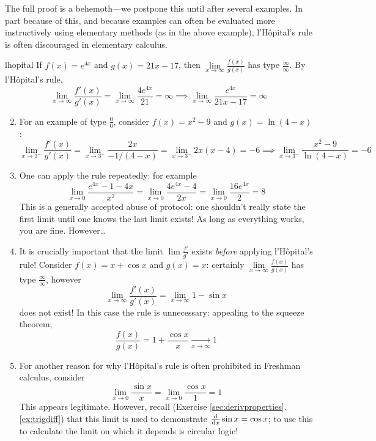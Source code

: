 The full proof is a behemoth---we postpone this until after several examples. In part because of this, and because examples can often be  evaluated more instructively using elementary methods (as in the above example), l'Hôpital's rule is often discouraged in elementary calculus.


\goodbreak


\begin{examples}{}{lhopital}
	\exstart If $f(x)=e^{4x}$ and $g(x)=21x-17$, then $\lim\limits_{x\to\infty}\frac{f(x)}{g(x)}$ has type $\frac\infty\infty$. By l'Hôpital's rule,
	\[
	 	\lim_{x\to\infty}\frac{f'(x)}{g'(x)}
	 	=\lim_{x\to\infty}\frac{4e^{4x}}{21}=\infty
	 	\implies \lim_{x\to\infty}\frac{e^{4x}}{21x-17}=\infty
	\]
	
	\begin{enumerate}\setcounter{enumi}{1}\itemsep0pt
	  \item For an example of type $\frac 00$, consider $f(x)=x^2-9$ and $g(x)=\ln(4-x)$:
	  \[
		  \lim_{x\to 3^-}\frac{f'(x)}{g'(x)} 
		  =\lim_{x\to 3^-}\frac{2x}{-1/(4-x)} 
		  =\lim_{x\to 3^-}2x(x-4)=-6
		  \implies \lim_{x\to 3^-}\frac{x^2-9}{\ln(4-x)}=-6
	  \]
	  
	  \item One can apply the rule repeatedly: for example
	  \[
	  	\lim_{x\to 0}\frac{e^{4x}-1-4x}{x^2}
	  	=\lim_{x\to 0}\frac{4e^{4x}-4}{2x} 
	  	=\lim_{x\to 0}\frac{16e^{4x}}{2}=8
	  \]
	  This is a generally accepted abuse of protocol: one shouldn't really state the first limit until one knows the last limit exists! As long as everything works, you are fine. However\ldots
	  
	  \item\label{ex:lhopitalproblem1} It is crucially important that the limit $\lim\frac{f'}{g'}$ exists \emph{before} applying l'Hôpital's rule! Consider $f(x)=x+\cos x$ and $g(x)=x$: certainly $\lim\limits_{x\to\infty}\frac{f(x)}{g(x)}$ has type $\frac\infty\infty$, however
	  \[
	  	\lim\limits_{x\to\infty}\frac{f'(x)}{g'(x)}
	  	=\lim\limits_{x\to\infty}1-\sin x
	  \]
	  does not exist! In this case the rule is unnecessary: appealing to the squeeze theorem,
	  \[
	  	\frac{f(x)}{g(x)}
	  	=1+\frac{\cos x}x\xrightarrow[x\to\infty]{} 1
	  \]
	  
	 	\item For another reason for why l'Hôpital's rule is often prohibited in Freshman calculus, consider
	 	\[
	 		\lim_{x\to 0}\frac{\sin x}x
	 		=\lim_{x\to 0}\frac{\cos x}{1}=1
	 	\]
	 	This appears legitimate. However, recall (Exercise \ref*{sec:derivproperties}.\ref{ex:trigdiff}) that this limit is used to demonstrate $\frac{\mathrm{d} }{\mathrm{d} x}\sin x=\cos x$; to use this to calculate the limit on which it depends is circular logic!
	\end{enumerate}
\end{examples}

